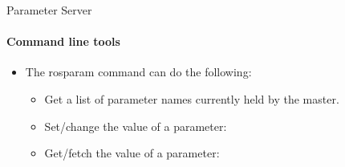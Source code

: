 \documentclass{beamer}
\begin{document}
\begin{frame}{Parameter Server}
    \framesubtitle{Command line tools}
    \begin{itemize}
        
        \item The {\ttfamily \colorbox{gray!30!white}{rosparam}} command can do the following:
        
        \begin{itemize}
            \item Get a list of parameter names currently held by the master.
            
                    \begin{terminal}
                        \color{green} 
                    \end{terminal} 
            \item Set/change the value of a parameter:
                    \begin{terminal}
                        \color{green} 
                     \end{terminal}   
            
            \item Get/fetch the value of a parameter:
                    \begin{terminal}
                        \color{green} 
                       \end{terminal}                                            
        \end{itemize}
    \end{itemize}
\end{frame}
\end{document}
